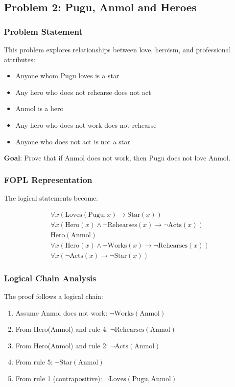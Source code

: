 \documentclass[11pt,a4paper]{article}
\begin{document}
\subsection{Problem 2: Pugu, Anmol and Heroes}

\subsubsection{Problem Statement}

This problem explores relationships between love, heroism, and professional attributes:
\begin{itemize}
    \item Anyone whom Pugu loves is a star
    \item Any hero who does not rehearse does not act
    \item Anmol is a hero
    \item Any hero who does not work does not rehearse
    \item Anyone who does not act is not a star
\end{itemize}

\textbf{Goal}: Prove that if Anmol does not work, then Pugu does not love Anmol.

\subsubsection{FOPL Representation}

The logical statements become:

\begin{align}
&\forall x (\text{Loves}(\text{Pugu}, x) \rightarrow \text{Star}(x)) \\
&\forall x (\text{Hero}(x) \wedge \neg\text{Rehearses}(x) \rightarrow \neg\text{Acts}(x)) \\
&\text{Hero}(\text{Anmol}) \\
&\forall x (\text{Hero}(x) \wedge \neg\text{Works}(x) \rightarrow \neg\text{Rehearses}(x)) \\
&\forall x (\neg\text{Acts}(x) \rightarrow \neg\text{Star}(x))
\end{align}

\subsubsection{Logical Chain Analysis}

The proof follows a logical chain:
\begin{enumerate}
    \item Assume Anmol does not work: $\neg\text{Works}(\text{Anmol})$
    \item From Hero(Anmol) and rule 4: $\neg\text{Rehearses}(\text{Anmol})$
    \item From Hero(Anmol) and rule 2: $\neg\text{Acts}(\text{Anmol})$
    \item From rule 5: $\neg\text{Star}(\text{Anmol})$
    \item From rule 1 (contrapositive): $\neg\text{Loves}(\text{Pugu}, \text{Anmol})$
\end{enumerate}
\end{document}
